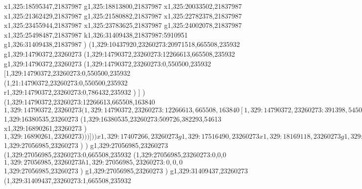 {x1,325:18595347,21837987
g1,325:18813800,21837987
x1,325:20033502,21837987
x1,325:21362429,21837987
g1,325:21580882,21837987
x1,325:22782378,21837987
x1,325:23455944,21837987
x1,325:23783625,21837987
g1,325:24002078,21837987
x1,325:25498487,21837987
k1,326:31409438,21837987:5910951
g1,326:31409438,21837987
)
(1,329:10437920,23260273:20971518,665508,235932
g1,329:14790372,23260273
(1,329:14790372,23260273:12266613,665508,235932
g1,329:14790372,23260273
(1,329:14790372,23260273:0,550500,235932
[1,329:14790372,23260273:0,550500,235932
(1,21:14790372,23260273:0,550500,235932
r1,329:14790372,23260273:0,786432,235932
)
]
)
(1,329:14790372,23260273:12266613,665508,163840
$1,329:14790372,23260273
(1,329:14790372,23260273:12266613,665508,163840
[1,329:14790372,23260273:391398,545041,127431
(1,329:14931461,23087330:0,372098,0
x1,329:15259142,23087330
)
(1,329:14790372,23260273:391398,455111,127431
x1,329:15111227,23260273
)
]
x1,329:15834398,23260273
(1,329:15834398,23260273:1055863,665508,0
(1,329:15834398,23260273:1055863,665508,0
[1,329:15834398,23260273:1055863,665508,0
(1,329:15834398,22857819:1055863,197518,89201
k1,329:16210579,22857819:376181
x1,329:16485864,22857819
k1,329:16890261,22857819:376180
)
(1,329:15834398,23260273:1055863,240435,0
x1,329:16489759,23260273
(1,329:16489759,23260273:-109224,0,0
)
(1,329:16380535,23260273:509726,0,0
(1,329:16380535,23260273:509726,0,0
$1,329:16380535,23260273
(1,329:16380535,23260273:509726,382293,54613
x1,329:16890261,23260273
)
$1,329:16890261,23260273
)
)
)
]
)
)
x1,329:17407266,23260273
g1,329:17516490,23260273
x1,329:18169118,23260273
g1,329:18351158,23260273
x1,329:18860884,23260273
g1,329:19042924,23260273
x1,329:19625468,23260273
g1,329:19771100,23260273
x1,329:20280826,23260273
g1,329:20426458,23260273
x1,329:20765758,23260273
x1,329:21377884,23260273
x1,329:22355918,23260273
g1,329:22501550,23260273
x1,329:23011276,23260273
g1,329:23156908,23260273
x1,329:23496208,23260273
[1,329:23532616,23260273:391398,545041,127431
(1,329:23673705,23087330:0,372098,0
x1,329:24001386,23087330
)
(1,329:23532616,23260273:391398,455111,127431
x1,329:23853471,23260273
)
]
x1,329:24576642,23260273
g1,329:24758682,23260273
x1,329:25414043,23260273
g1,329:25596083,23260273
x1,329:26113088,23260273
g1,329:26222312,23260273
x1,329:27056985,23260273
)
$1,329:27056985,23260273
)
)
g1,329:27056985,23260273
(1,329:27056985,23260273:0,665508,235932
(1,329:27056985,23260273:0,0,0
$1,329:27056985,23260273
h1,329:27056985,23260273:0,0,0
$1,329:27056985,23260273
)
g1,329:27056985,23260273
)
g1,329:31409437,23260273
(1,329:31409437,23260273:1,665508,235932
}
